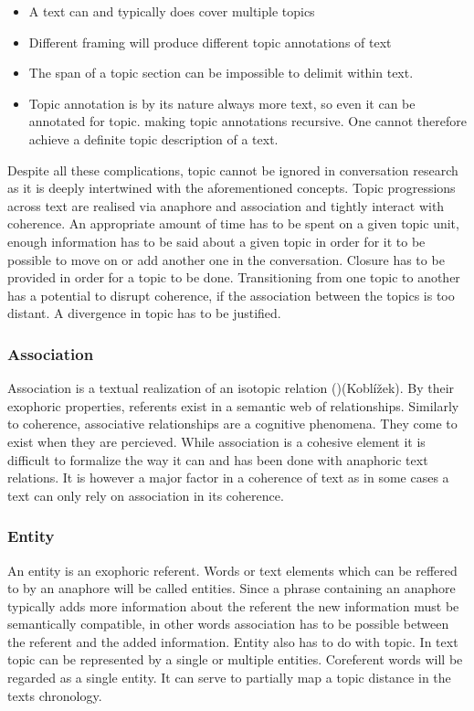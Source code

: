 \documentclass[12pt]{report}
\begin{document}
{\begin{itemize}
\item
A text can and typically does cover multiple topics
\item
Different framing will produce different topic annotations of text
\item
The span of a topic section can be impossible to delimit within text.
\item
Topic annotation is by its nature always more text,
            so even it can be annotated for topic.
            making topic annotations recursive.
            One cannot therefore achieve a definite topic description of a text.
\end{itemize}

\par
    Despite all these complications,
    topic cannot be ignored in conversation research
    as it is deeply intertwined with the aforementioned concepts.
    Topic progressions across text are realised via anaphore and association
    and tightly interact with coherence.
    An appropriate amount of time has to be spent on a given topic unit,
    enough information has to be said about a given topic
    in order for it to be possible to move on or add another one in the conversation.
    Closure has to be provided in order for a topic to be done.
    Transitioning from one topic to another has a potential to disrupt coherence,
    if the association between the topics is too distant.
    A divergence in topic has to be justified.

\subsubsection{Association}
\par
    Association is a textual realization of an isotopic relation ()(Koblížek).
    By their exophoric properties, referents exist in a semantic web of relationships.
    Similarly to coherence, associative relationships are a cognitive phenomena.
    They come to exist when they are percieved.
    While association is a cohesive element it is difficult to formalize
    the way it can and has been done with anaphoric text relations.
    It is however a major factor in a coherence of text as
    in some cases a text can only rely on association in its coherence.

\subsubsection{Entity}
\par
    An entity is an exophoric referent.
    Words or text elements which can be reffered to by an anaphore will be called entities.
    Since a phrase containing an anaphore typically adds more information about the referent
    the new information must be semantically compatible,
    in other words association has to be possible between the referent and the added information.
    Entity also has to do with topic.
    In text topic can be represented by a single or multiple entities.
    Coreferent words will be regarded as a single entity.
    It can serve to partially map a topic distance in the texts chronology.

}
\end{document}

